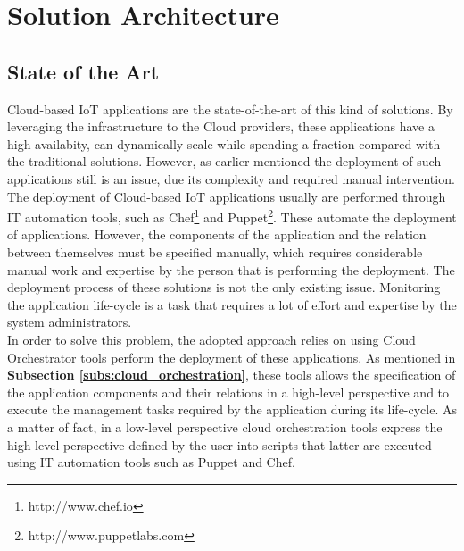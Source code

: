 \section{Solution Architecture}
\label{sec:solution_architecture}
\subsection{State of the Art}
\label{sub:state_of_art}
Cloud-based IoT applications are the state-of-the-art of this kind of solutions. By leveraging
the infrastructure to the Cloud providers, these applications have a high-availabity, can dynamically
scale while spending a fraction compared with the traditional solutions. However, as earlier
mentioned the deployment of such applications still is an issue, due its complexity and
required manual intervention. The deployment of Cloud-based IoT applications usually are performed
through IT automation tools, such as Chef\footnote{http://www.chef.io} and Puppet\footnote{http://www.puppetlabs.com}.
These automate the deployment of applications. However, the components of the application and the relation between
themselves must be specified manually, which requires considerable manual work and expertise by the person that
is performing the deployment. The deployment process of these solutions is not the only existing issue.
Monitoring the application life-cycle is a task that requires a lot of effort and expertise by the system
administrators.\\

In order to solve this problem, the adopted approach relies on using Cloud Orchestrator tools perform the
deployment of these applications. As mentioned in \textbf{Subsection \ref{subs:cloud_orchestration}},
these tools allows the specification of the application components and their relations in a high-level perspective
and to execute the management tasks required by the application during its life-cycle. As a matter of fact,
in a low-level perspective cloud orchestration tools express the high-level perspective defined by the user
into scripts that latter are executed using IT automation tools such as Puppet and Chef.
